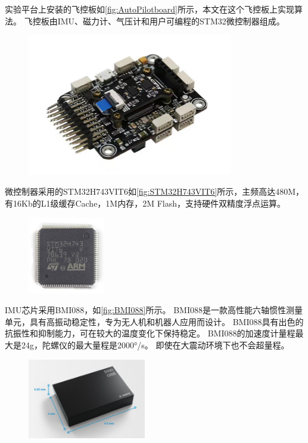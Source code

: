 \documentclass[
  type=master
]{gdutthesis}
\begin{document}
实验平台上安装的飞控板如\autoref{fig:AutoPilotboard}所示，本文在这个飞控板上实现算法。
飞控板由IMU、磁力计、气压计和用户可编程的STM32微控制器组成。
\begin{figure}[H]
	\centering
	\includegraphics[width=0.8\textwidth]{acfly.jpg}
	\label{fig:AutoPilotboard}
\end{figure}

微控制器采用的STM32H743VIT6如\autoref{fig:STM32H743VIT6}所示，主频高达480M，有16Kb的L1级缓存Cache，1M内存，2M Flash，支持硬件双精度浮点运算。
\begin{figure}[H]
	\centering
	\includegraphics[width=0.3\textwidth]{St-Semiconductor-Chips-Electronic-Component-Lqfp-100-Stm32h743vit6.jpg}
	\label{fig:STM32H743VIT6}
\end{figure}

IMU芯片采用BMI088，如\autoref{fig:BMI088}所示。
BMI088是一款高性能六轴惯性测量单元，具有高振动稳定性，专为无人机和机器人应用而设计。
BMI088具有出色的抗振性和抑制能力，可在较大的温度变化下保持稳定。
BMI088的加速度计量程最大是24g，陀螺仪的最大量程是2000°/s。
即使在大震动环境下也不会超量程。
\begin{figure}[H]
	\centering
	\includegraphics[width=0.46\textwidth]{屏幕截图 2022-03-30 151212.png}
	\label{fig:BMI088}
\end{figure}
\end{document}

